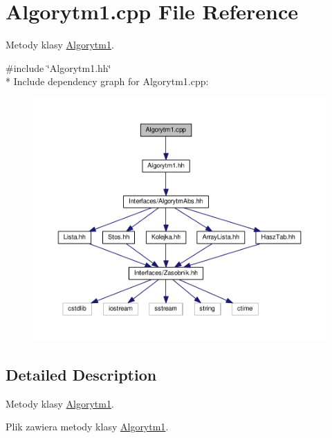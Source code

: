 \hypertarget{a00018}{}\section{Algorytm1.\+cpp File Reference}
\label{a00018}


Metody klasy \hyperlink{a00002}{Algorytm1}.  


{\ttfamily \#include \char`\"{}Algorytm1.\+hh\char`\"{}}\\*
Include dependency graph for Algorytm1.\+cpp\+:
\nopagebreak
\begin{figure}[H]
\begin{center}
\leavevmode
\includegraphics[width=350pt]{a00053}
\end{center}
\end{figure}


\subsection{Detailed Description}
Metody klasy \hyperlink{a00002}{Algorytm1}. 

Plik zawiera metody klasy \hyperlink{a00002}{Algorytm1}. 